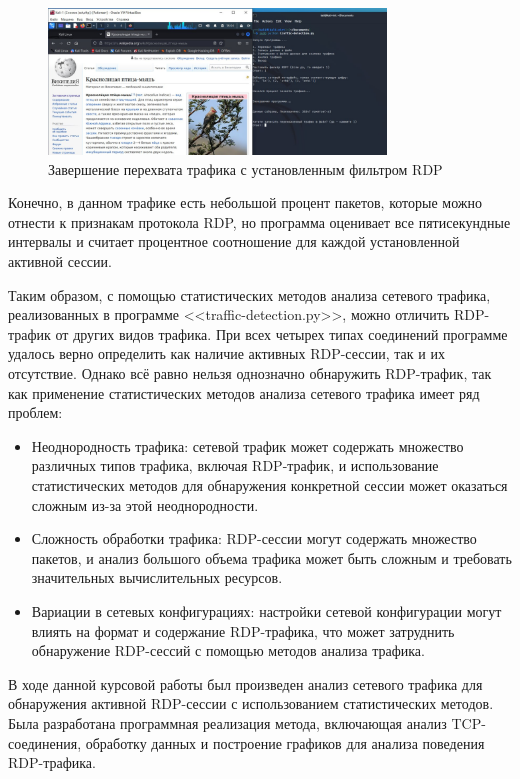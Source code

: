 \documentclass[bachelor, och, coursework]{SCWorks}
\begin{document}
\begin{figure}[H]
  \centering
  \includegraphics[width=0.8\textwidth]{photo/http2.jpg}
  \caption{Завершение перехвата трафика с установленным фильтром RDP}
  \label{http1}
\end{figure}

Конечно, в данном трафике есть небольшой процент пакетов, которые можно отнести к признакам протокола RDP,
но программа оценивает все пятисекундные интервалы и считает процентное соотношение для каждой установленной активной сессии.


Таким образом, с помощью статистических методов анализа сетевого трафика, реализованных в программе <<traffic-detection.py>>, можно
отличить RDP-трафик от других видов трафика. При всех четырех типах соединений программе удалось верно определить как наличие активных RDP-сессии,
так и их отсутствие. Однако всё равно нельзя однозначно обнаружить RDP-трафик, так как применение статистических методов анализа сетевого трафика
имеет ряд проблем:

\begin{itemize}
  \item Неоднородность трафика: сетевой трафик может содержать множество различных типов трафика, включая RDP-трафик, и использование статистических 
  методов для обнаружения конкретной сессии может оказаться сложным из-за этой неоднородности.
  \item Сложность обработки трафика: RDP-сессии могут содержать множество пакетов, и анализ большого объема трафика может быть сложным и требовать 
  значительных вычислительных ресурсов.
  \item Вариации в сетевых конфигурациях: настройки сетевой конфигурации могут влиять на формат и содержание RDP-трафика, что может затруднить 
  обнаружение RDP-сессий с помощью методов анализа трафика.
\end{itemize}

\conclusion
  
В ходе данной курсовой работы был произведен анализ сетевого трафика для обнаружения активной RDP-сессии с использованием статистических методов. 
Была разработана программная реализация метода, включающая анализ TCP-соединения, обработку данных и построение графиков для анализа поведения 
RDP-трафика. 
\end{document}
